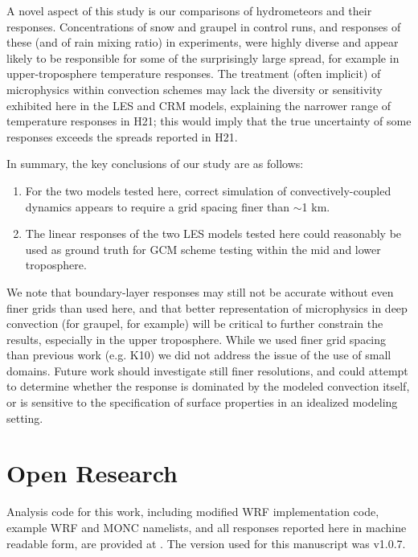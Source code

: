 \documentclass[draft]{agujournal2019}
\begin{document}
A novel aspect of this study is our comparisons of hydrometeors and their
responses. Concentrations of snow and graupel in control runs, and responses of
these (and of rain mixing ratio) in experiments, were highly diverse and appear
likely to be responsible for some of the surprisingly large spread, for example
in upper-troposphere temperature responses. The treatment (often implicit) of
microphysics within convection schemes may lack the diversity or sensitivity
exhibited here in the LES and CRM models, explaining the narrower range of
temperature responses in H21; this would imply that the true uncertainty of some
responses exceeds the spreads reported in H21.

In summary, the key conclusions of our study are as follows:

\begin{enumerate}
    \item For the two models tested here, correct simulation of
    convectively-coupled dynamics appears to require a grid spacing finer than
    $\sim$1 km.
    \item The linear responses of the two LES models tested here could
    reasonably be used as ground truth for GCM scheme testing within the mid and
    lower troposphere.
\end{enumerate}

We note that boundary-layer responses may still not be accurate without even
finer grids than used here, and that better representation of microphysics in
deep convection (for graupel, for example) will be critical to further constrain
the results, especially in the upper troposphere. While we used finer grid
spacing than previous work (e.g. K10) we did not address the issue of the use of
small domains. Future work should investigate still finer resolutions, and could
attempt to determine whether the response is dominated by the modeled convection
itself, or is sensitive to the specification of surface properties in an
idealized modeling setting.

\section{Open Research}

Analysis code for this work, including modified WRF implementation code, example
WRF and MONC namelists, and all responses reported here in machine readable
form, are provided at . The version used for this
manuscript was v1.0.7.
\end{document}
